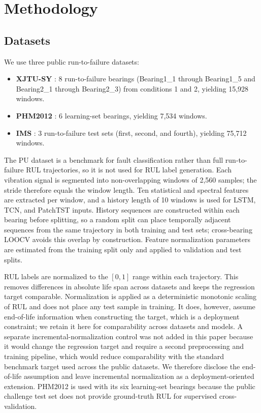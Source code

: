 \documentclass[pdflatex,sn-mathphys-num]{sn-jnl}
\begin{document}
\section{Methodology}
\subsection{Datasets}
We use three public run-to-failure datasets:
\begin{itemize}
    \item \textbf{XJTU-SY} \cite{xjtusy2019dataset}: 8 run-to-failure bearings (Bearing1\_1 through Bearing1\_5 and Bearing2\_1 through Bearing2\_3) from conditions 1 and 2, yielding 15,928 windows.
    \item \textbf{PHM2012} \cite{nectoux2012pronostia}: 6 learning-set bearings, yielding 7,534 windows.
    \item \textbf{IMS} \cite{ims2006}: 3 run-to-failure test sets (first, second, and fourth), yielding 75,712 windows.
\end{itemize}
The PU dataset is a benchmark for fault classification rather than full run-to-failure RUL trajectories, so it is not used for RUL label generation. Each vibration signal is segmented into non-overlapping windows of 2,560 samples; the stride therefore equals the window length. Ten statistical and spectral features are extracted per window, and a history length of 10 windows is used for LSTM, TCN, and PatchTST inputs. History sequences are constructed within each bearing before splitting, so a random split can place temporally adjacent sequences from the same trajectory in both training and test sets; cross-bearing LOOCV avoids this overlap by construction. Feature normalization parameters are estimated from the training split only and applied to validation and test splits.

RUL labels are normalized to the $[0,1]$ range within each trajectory. This removes differences in absolute life span across datasets and keeps the regression target comparable. Normalization is applied as a deterministic monotonic scaling of RUL and does not place any test sample in training. It does, however, assume end-of-life information when constructing the target, which is a deployment constraint; we retain it here for comparability across datasets and models. A separate incremental-normalization control was not added in this paper because it would change the regression target and require a second preprocessing and training pipeline, which would reduce comparability with the standard benchmark target used across the public datasets. We therefore disclose the end-of-life assumption and leave incremental normalization as a deployment-oriented extension. PHM2012 is used with its six learning-set bearings because the public challenge test set does not provide ground-truth RUL for supervised cross-validation.
\end{document}
